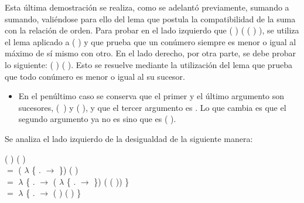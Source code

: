 \begin{AgdaAlign}
Esta última demostración se realiza, como se adelantó previamente, sumando a sumando, valiéndose para ello del lema  que postula la compatibilidad de la suma con la relación de orden. Para probar en el lado izquierdo que \AgdaFunction{[}  \AgdaFunction{]} ( ) \AgdaFunction{$\leq$} ( ( )  ), se utiliza el lema  aplicado a ( ) y  que prueba que un conúmero siempre es menor o igual al máximo de sí mismo con otro. En el lado derecho, por otra parte, se debe probar lo siguiente: \AgdaFunction{[}  \AgdaFunction{]} ( ) \AgdaFunction{$\leq$} ( ). Esto se resuelve mediante la utilización del lema  que prueba que todo conúmero es menor o igual al su sucesor.


\begin{itemize}
\item En el penúltimo caso se conserva que el primer y el último argumento son sucesores, \hbox{( )} y ( ), y que el tercer argumento es . Lo que cambia es que el segundo argumento ya no es  sino que es ( ).
\end{itemize}

Se analiza el lado izquierdo de la desigualdad de la siguiente manera:

 (  \AgdaFunction{+}  ) ( \AgdaFunction{+}  ) \\
$=$  ( $\lambda$ \{ . $\rightarrow$   \AgdaFunction{+}   \}) ( ) \\
$=$  $\lambda$ \{ . $\rightarrow$  ( $\lambda$ \{ . $\rightarrow$   \AgdaFunction{+}   \}) ( ( )) \} \\
$=$  $\lambda$ \{ . $\rightarrow$  (  \AgdaFunction{+}  ) ( ) \}


\end{AgdaAlign}
